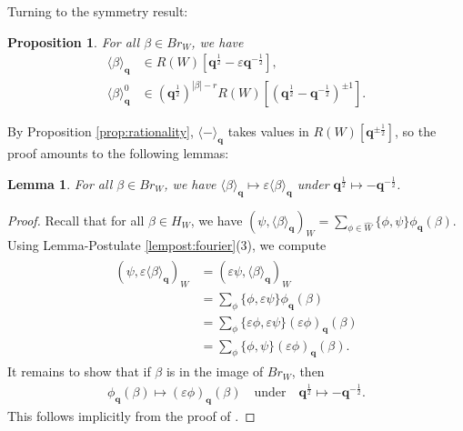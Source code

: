 \documentclass[a4paper,10pt,leqno]{amsart}
\theoremstyle{plain}
\theoremstyle{plain}
\theoremstyle{plain}
\newtheorem{lem}[thm]{Lemma}
\newtheorem{prop}[thm]{Proposition}
\theoremstyle{definition}
\theoremstyle{remark}
\newcommand{\Br}{\mathit{Br}}
\newcommand{\Q}{\bm{q}}
\newcommand{\Tr}[1]{\langle{#1}\rangle_{\Q}}
\begin{document}
\subsubsection{}

Turning to the symmetry result:

\begin{prop}\label{prop:symmetry}
For all $\beta \in \Br_W$, we have
\begin{align}
\Tr{\beta} 
&\in R(W)[\Q^{\frac{1}{2}} - \varepsilon \Q^{-\frac{1}{2}}],\\
\Tr{\beta}^0
&\in 
	(\Q^{\frac{1}{2}})^{|\beta| - r}
	R(W)[(\Q^{\frac{1}{2}} - \Q^{-\frac{1}{2}})^{\pm 1}].
\end{align}
\end{prop}

By Proposition \ref{prop:rationality}, $\Tr{-}$ takes values in $R(W)[\Q^{\pm\frac{1}{2}}]$, so the proof amounts to the following lemmas:

\begin{lem}\label{lem:symmetry}
For all $\beta \in \Br_W$, we have $\Tr{\beta} \mapsto \varepsilon \Tr{\beta}$ under $\Q^{\frac{1}{2}} \mapsto -\Q^{-\frac{1}{2}}$.
\end{lem}

\begin{proof}
Recall that for all $\beta \in H_W$, we have $(\psi, \Tr{\beta})_W = \sum_{\phi \in \hat{W}} {\{\phi, \psi\}} \phi_{\Q}(\beta)$.
Using Lemma-Postulate \ref{lempost:fourier}(3), we compute
\begin{align}\begin{split}
(\psi, \varepsilon \Tr{\beta})_W 
&= (\varepsilon\psi, \Tr{\beta})_W \\
&= \sum_\phi
	{\{\phi, \varepsilon \psi\}}
	\phi_{\Q}(\beta)\\
&=	\sum_\phi
	{\{\varepsilon \phi, \varepsilon \psi\}}
	(\varepsilon \phi)_{\Q}(\beta)\\
&=	\sum_\phi
	{\{\phi, \psi\}}
	(\varepsilon \phi)_{\Q}(\beta).
\end{split}\end{align}
It remains to show that if $\beta$ is in the image of $\Br_W$, then 
\begin{align}
\phi_{\Q}(\beta) \mapsto (\varepsilon \phi)_{\Q}(\beta)
\quad\text{under}\quad
\Q^{\frac{1}{2}} \mapsto -\Q^{-\frac{1}{2}}.
\end{align}
This follows implicitly from the proof of \cite[Prop.\ 9.4.1(a)]{gp}.
\end{proof}
\end{document}
